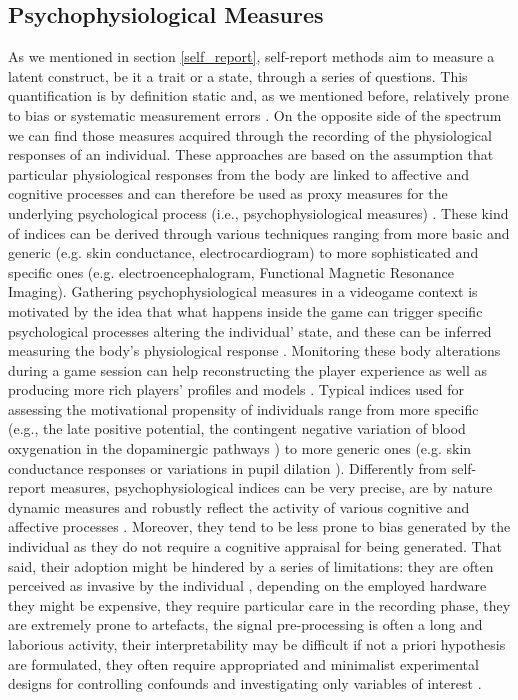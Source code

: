 \subsection{Psychophysiological Measures}
\label{psychophisio} 
As we mentioned in section \ref{self_report}, self-report methods aim to measure a latent construct, be it a trait or a state, through a series of questions. This quantification is by definition static and, as we mentioned before, relatively prone to bias or systematic measurement errors \cite{van2009psychologically}. On the opposite side of the spectrum we can find those measures acquired through the recording of the physiological responses of an individual. These approaches are based on the assumption that particular physiological responses from the body are linked to affective and cognitive processes and can therefore be used as proxy measures for the underlying psychological process (i.e., psychophysiological measures) \cite{cacioppo2007handbook}. These kind of indices can be derived through various techniques ranging from more basic and generic (e.g. skin conductance, electrocardiogram) to more sophisticated and specific ones (e.g. electroencephalogram, Functional Magnetic Resonance Imaging). Gathering psychophysiological measures in a videogame context is motivated by the idea that what happens inside the game can trigger specific psychological processes altering the individual' state, and these can be inferred measuring the body’s physiological response \cite{yannakakis2013player}. Monitoring these body alterations during a game session can help reconstructing the player experience \cite{mirza2013does} as well as producing more rich players’ profiles and models \cite{yannakakis2013player}. Typical indices used for assessing the motivational propensity of individuals range from more specific (e.g., the late positive potential, the contingent negative variation of blood oxygenation in the dopaminergic pathways \cite{cacioppo2007handbook}) to more generic ones (e.g. skin conductance responses or variations in pupil dilation \cite{cacioppo2007handbook}). Differently from self-report measures, psychophysiological indices can be very precise, are by nature dynamic measures and robustly reflect the activity of various cognitive and affective processes \cite{cacioppo2007handbook}. Moreover, they tend to be less prone to bias generated by the individual as they do not require a cognitive appraisal for being generated. That said, their adoption might be hindered by a series of limitations: they are often perceived as invasive by the individual \cite{yannakakis2013player}, depending on the employed hardware they might be expensive, they require particular care in the recording phase, they are extremely prone to artefacts, the signal pre-processing is often a long and laborious activity, their interpretability may be difficult if not a priori hypothesis are formulated, they often require appropriated and minimalist experimental designs for controlling confounds and investigating only variables of interest \cite{liu2017toward}.
    

